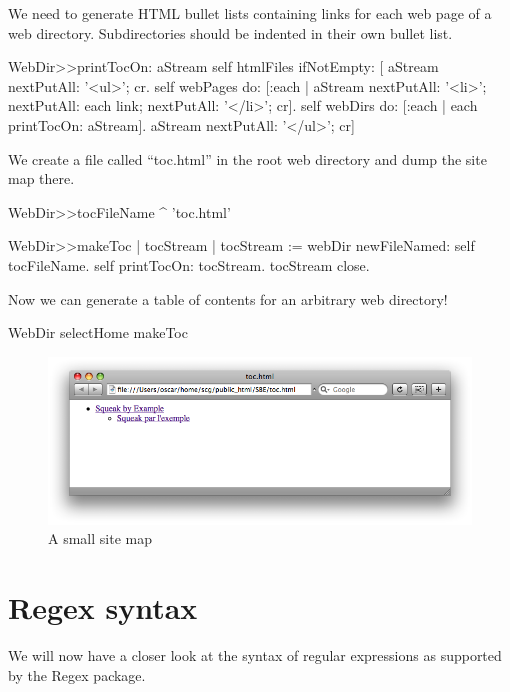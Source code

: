 \documentclass[a4paper,10pt,twoside]{book}
\begin{document}
We need to generate HTML bullet lists containing links for each web page of a web directory.
Subdirectories should be indented in their own bullet list.
\begin{code}{}
WebDir>>printTocOn: aStream 
	self htmlFiles
		ifNotEmpty: [
			aStream nextPutAll: '<ul>'; cr.
			self webPages
				do: [:each | aStream nextPutAll: '<li>';
						 nextPutAll: each link;
						 nextPutAll: '</li>'; cr].
			self webDirs
				do: [:each | each printTocOn: aStream].
			aStream nextPutAll: '</ul>'; cr]
\end{code}

We create a file called ``toc.html'' in the root web directory and dump the site map there.
\begin{code}{}
WebDir>>tocFileName
	^ 'toc.html'

WebDir>>makeToc
	| tocStream |
	tocStream := webDir newFileNamed: self tocFileName.
	self printTocOn: tocStream.
	tocStream close.
\end{code}

Now we can generate a table of contents for an arbitrary web directory!
\begin{code}{}
WebDir selectHome makeToc
\end{code}

\begin{figure}[tbh]
\begin{center}
\includegraphics[width=\textwidth]{SBE-toc}
\caption{A small site map}
\label{fig:SBE-toc}
\end{center}
\end{figure}

\section{Regex syntax}

We will now have a closer look at the syntax of regular expressions as supported by the Regex package.
\end{document}
